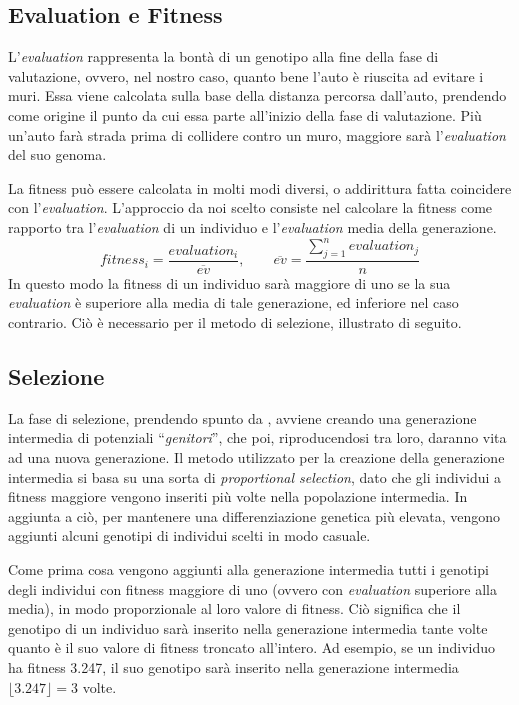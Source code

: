 \documentclass[a4paper,12pt]{article}
\begin{document}
\subsection{Evaluation e Fitness} \label{evFitness}
L'\emph{evaluation} rappresenta la bontà di un genotipo alla fine della fase di valutazione, ovvero, nel nostro caso, quanto bene l'auto è riuscita ad evitare i muri. Essa viene calcolata sulla base della distanza percorsa dall'auto, prendendo come origine il punto da cui essa parte all'inizio della fase di valutazione. Più un'auto farà strada prima di collidere contro un muro, maggiore sarà l'\emph{evaluation} del suo genoma. 

La fitness può essere calcolata in molti modi diversi, o addirittura fatta coincidere con l'\emph{evaluation}. L'approccio da noi scelto consiste nel calcolare la fitness come rapporto tra l'\emph{evaluation} di un individuo e l'\emph{evaluation} media della generazione. 
\begin{equation}
	fitness_i = \frac{evaluation_i}{\overline{ev}}, \hspace{2em} \overline{ev} = \frac{\sum_{j = 1}^{n} evaluation_j }{n}
\end{equation}
In questo modo la fitness di un individuo sarà maggiore di uno se la sua \emph{evaluation} è superiore alla media di tale generazione, ed inferiore nel caso contrario. Ciò è necessario per il metodo di selezione, illustrato di seguito.
\subsection{Selezione}
La fase di selezione, prendendo spunto da \cite{arztRepo}, avviene creando una generazione intermedia di potenziali ``\emph{genitori}'', che poi, riproducendosi tra loro, daranno vita ad una nuova generazione. Il metodo utilizzato per la creazione della generazione intermedia si basa su una sorta di \emph{proportional selection}, dato che gli individui a fitness maggiore vengono inseriti più volte nella popolazione intermedia. In aggiunta a ciò, per mantenere una differenziazione genetica più elevata, vengono aggiunti alcuni genotipi di individui scelti in modo casuale.  

Come prima cosa vengono aggiunti alla generazione intermedia tutti i genotipi degli individui con fitness maggiore di uno (ovvero con \emph{evaluation} superiore alla media), in modo proporzionale al loro valore di fitness. Ciò significa che il genotipo di un individuo sarà inserito nella generazione intermedia tante volte quanto è il suo valore di fitness troncato all'intero. Ad esempio, se un individuo ha fitness 3.247, il suo genotipo sarà inserito nella generazione intermedia $\lfloor3.247\rfloor = 3$ volte. 
\end{document}
